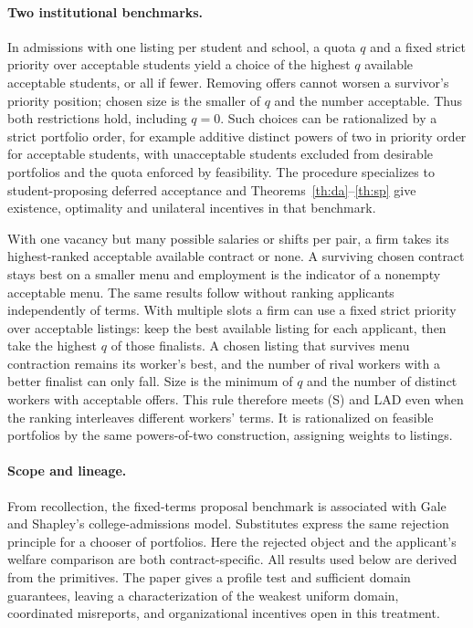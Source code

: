 \documentclass[11pt]{article}
\begin{document}
\paragraph{Two institutional benchmarks.}
In admissions with one listing per student and school, a quota $q$ and a fixed strict priority over acceptable students yield a choice of the highest $q$ available acceptable students, or all if fewer. Removing offers cannot worsen a survivor's priority position; chosen size is the smaller of $q$ and the number acceptable. Thus both restrictions hold, including $q=0$. Such choices can be rationalized by a strict portfolio order, for example additive distinct powers of two in priority order for acceptable students, with unacceptable students excluded from desirable portfolios and the quota enforced by feasibility. The procedure specializes to student-proposing deferred acceptance and Theorems~\ref{th:da}--\ref{th:sp} give existence, optimality and unilateral incentives in that benchmark.

With one vacancy but many possible salaries or shifts per pair, a firm takes its highest-ranked acceptable available contract or none. A surviving chosen contract stays best on a smaller menu and employment is the indicator of a nonempty acceptable menu. The same results follow without ranking applicants independently of terms. With multiple slots a firm can use a fixed strict priority over acceptable listings: keep the best available listing for each applicant, then take the highest $q$ of those finalists. A chosen listing that survives menu contraction remains its worker's best, and the number of rival workers with a better finalist can only fall. Size is the minimum of $q$ and the number of distinct workers with acceptable offers. This rule therefore meets (S) and LAD even when the ranking interleaves different workers' terms. It is rationalized on feasible portfolios by the same powers-of-two construction, assigning weights to listings.

\paragraph{Scope and lineage.}
From recollection, the fixed-terms proposal benchmark is associated with Gale and Shapley's college-admissions model. Substitutes express the same rejection principle for a chooser of portfolios. Here the rejected object and the applicant's welfare comparison are both contract-specific. All results used below are derived from the primitives. The paper gives a profile test and sufficient domain guarantees, leaving a characterization of the weakest uniform domain, coordinated misreports, and organizational incentives open in this treatment.
\end{document}
